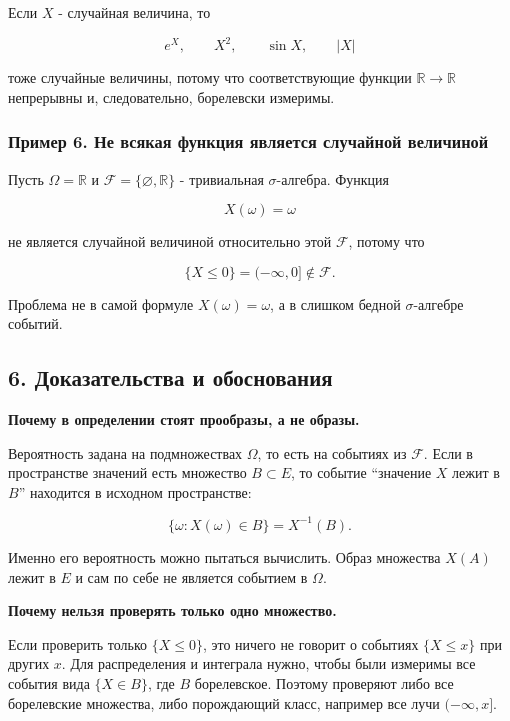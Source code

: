 \documentclass[
  11pt,
  a4paper,
]{article}
\begin{document}
Если \(X\) - случайная величина, то

\[
e^X,\qquad X^2,\qquad \sin X,\qquad |X|
\]

тоже случайные величины, потому что соответствующие функции
\(\mathbb R\to\mathbb R\) непрерывны и, следовательно, борелевски
измеримы.

\subsubsection{Пример 6. Не всякая функция является случайной
величиной}\label{ux43fux440ux438ux43cux435ux440-6.-ux43dux435-ux432ux441ux44fux43aux430ux44f-ux444ux443ux43dux43aux446ux438ux44f-ux44fux432ux43bux44fux435ux442ux441ux44f-ux441ux43bux443ux447ux430ux439ux43dux43eux439-ux432ux435ux43bux438ux447ux438ux43dux43eux439}

Пусть \(\Omega=\mathbb R\) и \(\mathcal F=\{\varnothing,\mathbb R\}\) -
тривиальная \(\sigma\)-алгебра. Функция

\[
X(\omega)=\omega
\]

не является случайной величиной относительно этой \(\mathcal F\), потому
что

\[
\{X\le0\}=(-\infty,0]\notin\mathcal F.
\]

Проблема не в самой формуле \(X(\omega)=\omega\), а в слишком бедной
\(\sigma\)-алгебре событий.

\subsection{6. Доказательства и
обоснования}\label{ux434ux43eux43aux430ux437ux430ux442ux435ux43bux44cux441ux442ux432ux430-ux438-ux43eux431ux43eux441ux43dux43eux432ux430ux43dux438ux44f}

\textbf{Почему в определении стоят прообразы, а не образы.}

Вероятность задана на подмножествах \(\Omega\), то есть на событиях из
\(\mathcal F\). Если в пространстве значений есть множество
\(B\subset E\), то событие ``значение \(X\) лежит в \(B\)'' находится в
исходном пространстве:

\[
\{\omega:X(\omega)\in B\}=X^{-1}(B).
\]

Именно его вероятность можно пытаться вычислить. Образ множества
\(X(A)\) лежит в \(E\) и сам по себе не является событием в \(\Omega\).

\textbf{Почему нельзя проверять только одно множество.}

Если проверить только \(\{X\le0\}\), это ничего не говорит о событиях
\(\{X\le x\}\) при других \(x\). Для распределения и интеграла нужно,
чтобы были измеримы все события вида \(\{X\in B\}\), где \(B\)
борелевское. Поэтому проверяют либо все борелевские множества, либо
порождающий класс, например все лучи \((-\infty,x]\).
\end{document}
